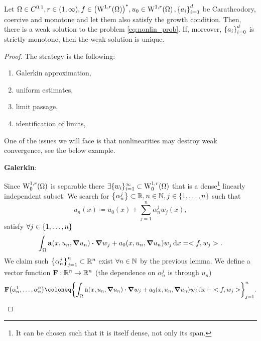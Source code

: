 \documentclass{article}
\begin{document}
\begin{theorem}
	Let $\Omega \in C^{0,1}, r \in (1,\infty),f \in \qty(\WkpSet[1][r]{\Omega})^{*}, u_0 \in \WkpSet[1][r]{\Omega},  \qty{a_i}_{i=0}^d$ be Caratheodory, coercive and monotone and let them also satisfy the growth condition. Then, there is a weak solution to the problem \ref{eq:nonlin_prob}.
	If, moreover, $\qty{a_i}_{i=0}^d$ is strictly monotone, then the weak solution is unique.
\end{theorem}

\begin{proof}
	The strategy is the following:
	\begin{enumerate}
		\item Galerkin approximation,
		\item uniform estimates,
		\item limit passage,
		\item identification of limits,
	\end{enumerate}
	One of the issues we will face is that nonlinearities may destroy weak convergence, see the below example. 

	\textbf{Galerkin}: 

	Since $\WkpzeroSet[1][r]{\Omega}$ is separable there $\exists \{w_i\}_{i=1}^{\infty} \subset \WkpzeroSet[1][r]{\Omega}$ that is a dense\footnote{It can be chosen such that it is itself dense, not only its span.} linearly independent subset. We search for $\qty{\alpha_n^j} \subset {\mathbb R}, n \in {\mathbb N}, j \in \qty{1, \dots, n}$ such that
	\[
		u_n(x) \coloneq u_0(x) + \sum_{j=1}^n \alpha^j_n w_j(x),
	\]
	satisfy $\forall j \in \qty{1, \dots, n}$
	\[
		\int_{\Omega}\vb{a}\qty(x, u_n, \grad u_n) \vdot \grad w_j + a_0\qty(x,u_n,\grad u_n)w_j\dd{x} = <f,w_j>.
	\]
	We claim such $\qty{\alpha^j_n}_{j=1}^n \subset {\mathbb R}^n$ exist $\forall n \in {\mathbb N}$ by the previous lemma. We define a vector function $\vb{F}: {\mathbb R}^{n} \to {\mathbb R}^{n}$  (the dependence on $\alpha_n^j$ is through $u_n$)
	\[
		\vb{F}\qty(\alpha^1_n, \dots, \alpha^n_n)\coloneq \qty{ \int_{\Omega}\vb{a}\qty(x, u_n, \grad u_n) \vdot \grad w_j + a_0\qty(x, u_n, \grad u_n) w_j \dd{x} - <f,w_j>}_{j=1}^n.
	\]


\end{proof}
\end{document}
